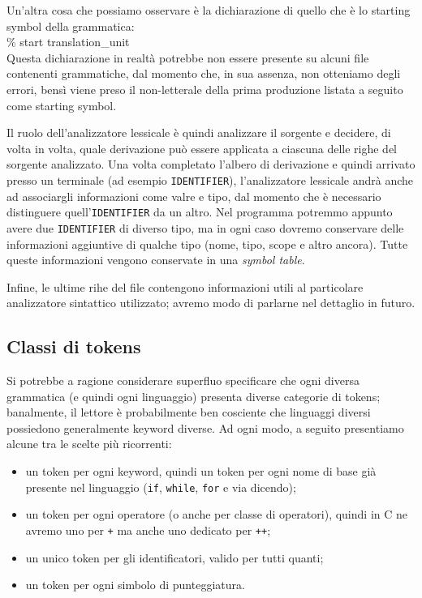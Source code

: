 \documentclass[class=book, crop=false, oneside, 12pt]{standalone}
\begin{document}
Un'altra cosa che possiamo osservare è la dichiarazione di quello che è lo starting symbol della grammatica:\\
\% start translation\_unit\\
Questa dichiarazione in realtà potrebbe non essere presente su alcuni file contenenti grammatiche, dal momento che, in sua assenza, non otteniamo degli errori, bensì viene preso il non-letterale della prima produzione listata a seguito come starting symbol.

Il ruolo dell’analizzatore lessicale è quindi analizzare il sorgente e decidere, di volta in volta, quale derivazione può essere applicata a ciascuna delle righe del sorgente analizzato. Una volta completato l'albero di derivazione e quindi arrivato presso un terminale (ad esempio \texttt{IDENTIFIER}), l'analizzatore lessicale andrà anche ad associargli informazioni come valre e tipo, dal momento che è necessario distinguere quell'\texttt{IDENTIFIER} da un altro. Nel programma potremmo appunto avere due \texttt{IDENTIFIER} di diverso tipo, ma in ogni caso dovremo conservare delle informazioni aggiuntive di qualche tipo (nome, tipo, scope e altro ancora). Tutte queste informazioni vengono conservate in una \emph{symbol table}.

Infine, le ultime rihe del file contengono informazioni utili al particolare analizzatore sintattico utilizzato; avremo modo di parlarne nel dettaglio in futuro.

\subsection{Classi di tokens}
Si potrebbe a ragione considerare superfluo specificare che ogni diversa grammatica (e quindi ogni linguaggio) presenta diverse categorie di tokens; banalmente, il lettore è probabilmente ben cosciente che linguaggi diversi possiedono generalmente keyword diverse. Ad ogni modo, a seguito presentiamo alcune tra le scelte più ricorrenti:
\begin{itemize}
    \item un token per ogni keyword, quindi un token per ogni nome di base già presente nel linguaggio (\texttt{if}, \texttt{while}, \texttt{for} e via dicendo);
    \item un token per ogni operatore (o anche per classe di operatori), quindi in C ne avremo uno per \texttt{+} ma anche uno dedicato per \texttt{++}; 
    \item un unico token per gli identificatori, valido per tutti quanti;
    \item un token per ogni simbolo di punteggiatura. 
\end{itemize}
\end{document}
